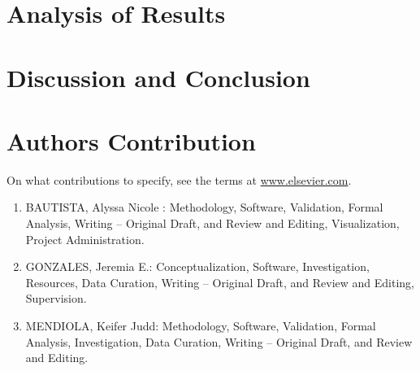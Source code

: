 \section{Analysis of Results}
\label{sec:results}


\section{Discussion and Conclusion}
\label{sec:conc}


\section{Authors Contribution}
On what contributions to specify, see the terms at \url{www.elsevier.com}.
\begin{enumerate}
    \item BAUTISTA, Alyssa Nicole : Methodology, Software, Validation, Formal Analysis, Writing – Original Draft, and Review and Editing, Visualization, Project Administration.
    \item GONZALES, Jeremia E.: Conceptualization, Software, Investigation, Resources, Data Curation, Writing – Original Draft, and Review and Editing, Supervision.
    \item MENDIOLA, Keifer Judd: Methodology, Software, Validation, Formal Analysis, Investigation, Data Curation, Writing – Original Draft, and Review and Editing.
\end{enumerate}




%


% 

